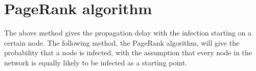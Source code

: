 %
%


%
%
%
%
%
%	
%	
%
%	
%				
%				
%				
%		
\section{PageRank algorithm}
\label{googlesec:5.4}


The above method gives the propagation delay with the infection starting on a certain node. The following method, the PageRank algorithm, will give the probability that a node is infected, with the assumption that every node in the network is equally likely to be infected as a starting point.\\

